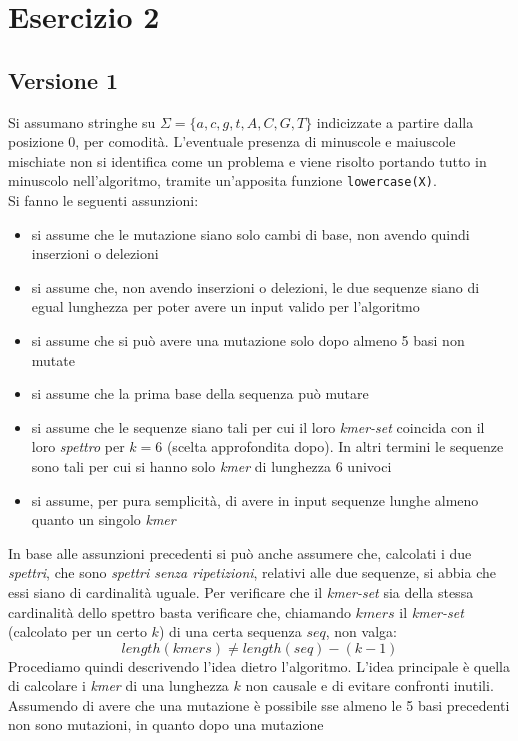 \documentclass[a4paper,12pt, oneside]{book}
\begin{document}
\chapter{Esercizio 2}
\section{Versione 1}
Si assumano stringhe su $\Sigma=\{a,c,g,t,A,C,G,T\}$
indicizzate a partire dalla posizione 0, per comodità. L'eventuale presenza di
minuscole e maiuscole mischiate non si identifica come un problema e viene
risolto portando tutto in minuscolo nell'algoritmo, tramite un'apposita funzione
\texttt{lowercase(X)}.\\
Si fanno le seguenti assunzioni:
\begin{itemize}
  \item si assume che le mutazione siano solo cambi di base, non avendo quindi
  inserzioni o delezioni
  \item si assume che, non avendo inserzioni o delezioni, le due sequenze siano
  di egual lunghezza per poter avere un input valido per l'algoritmo
  \item si assume che si può avere una mutazione solo dopo almeno 5 basi non
  mutate 
  \item si assume che la prima base della sequenza può mutare
  \item si assume che le sequenze siano tali per cui il loro \textit{kmer-set}
  coincida con il loro \textit{spettro} per $k=6$ (scelta approfondita dopo). In
  altri termini le sequenze 
  sono tali per cui si hanno solo \textit{kmer} di lunghezza 6 univoci
  \item si assume, per pura semplicità, di avere in input sequenze lunghe almeno
  quanto un singolo \textit{kmer}
\end{itemize}
In base alle assunzioni precedenti si può anche assumere che, calcolati i due
\textit{spettri}, che sono \textit{spettri senza ripetizioni}, relativi alle due
sequenze, si abbia che essi siano di cardinalità uguale. Per verificare che il
\textit{kmer-set} sia della stessa cardinalità dello spettro basta verificare
che, chiamando $kmers$ il \textit{kmer-set} (calcolato per un certo $k$) di una
certa sequenza $seq$, non valga: 
\[length(kmers) \neq length(seq)-(k-1)\]
Procediamo quindi descrivendo l'idea dietro l'algoritmo. L'idea principale è
quella di calcolare i \textit{kmer} di una lunghezza $k$ non causale e di
evitare confronti inutili. Assumendo di avere che una mutazione è possibile sse
almeno le 5 basi precedenti non sono mutazioni, in quanto dopo una mutazione
\end{document}
